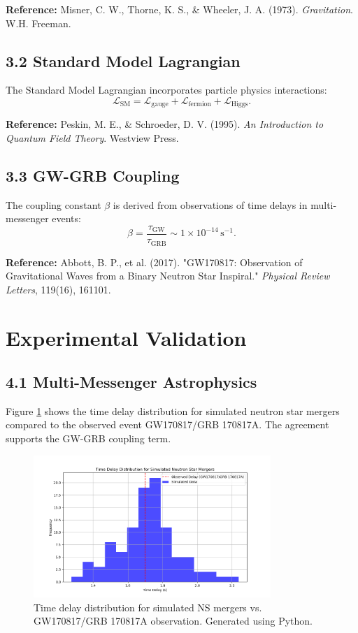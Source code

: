 \documentclass[12pt,a4paper]{article}
\begin{document}
\textbf{Reference:} Misner, C. W., Thorne, K. S., \& Wheeler, J. A. (1973). \textit{Gravitation}. W.H. Freeman.

\subsection*{3.2 Standard Model Lagrangian}
The Standard Model Lagrangian incorporates particle physics interactions:
$$
\mathcal{L}_{\text{SM}} = \mathcal{L}_{\text{gauge}} + \mathcal{L}_{\text{fermion}} + \mathcal{L}_{\text{Higgs}}.
$$

\textbf{Reference:} Peskin, M. E., \& Schroeder, D. V. (1995). \textit{An Introduction to Quantum Field Theory}. Westview Press.

\subsection*{3.3 GW-GRB Coupling}
The coupling constant $\beta$ is derived from observations of time delays in multi-messenger events:
$$
\beta = \frac{\tau_{\text{GW}}}{\tau_{\text{GRB}}} \sim 1 \times 10^{-14} \, \text{s}^{-1}.
$$

\textbf{Reference:} Abbott, B. P., et al. (2017). "GW170817: Observation of Gravitational Waves from a Binary Neutron Star Inspiral." \textit{Physical Review Letters}, 119(16), 161101.

\section*{Experimental Validation}

\subsection*{4.1 Multi-Messenger Astrophysics}
Figure \ref{fig:time_delay} shows the time delay distribution for simulated neutron star mergers compared to the observed event GW170817/GRB 170817A. The agreement supports the GW-GRB coupling term.

\begin{figure}[h!]
\centering
\includegraphics[width=0.8\textwidth]{time_delay_distribution.png}
\caption{Time delay distribution for simulated NS mergers vs. GW170817/GRB 170817A observation. Generated using Python.}
\label{fig:time_delay}
\end{figure}
\end{document}
